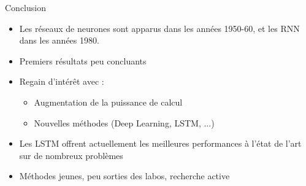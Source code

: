 \begin{frame}{Conclusion}
    \begin{itemize}
        \item Les réseaux de neurones sont apparus dans les années 1950-60, et les RNN dans les années 1980.
        \item Premiers résultats peu concluants
        \item Regain d'intérêt avec :
        \begin{itemize}
            \item Augmentation de la puissance de calcul
            \item Nouvelles méthodes (Deep Learning, LSTM, ...)
        \end{itemize}
        \item Les LSTM offrent actuellement les meilleures performances à l'état de l'art sur de nombreux problèmes
        \item Méthodes jeunes, peu sorties des labos, recherche active
    \end{itemize}
\end{frame}

